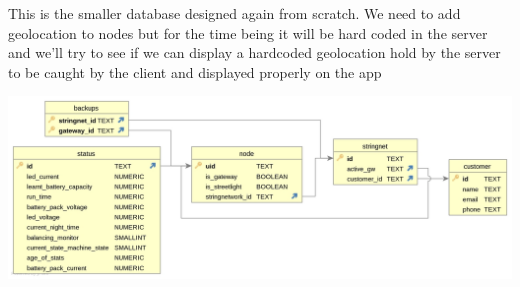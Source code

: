 \documentclass[a4paper,12pt]{article}
\begin{document}
This is the smaller database designed again from scratch. We need to add geolocation to nodes but for the time being it will be hard coded in the server and we'll try to see if we can display a hardcoded geolocation hold by the server to be caught by the client and displayed properly on the app

\noindent \includegraphics[width=14cm]{./SecondERSchemaGen2.jpg}

\printindex
\end{document}
